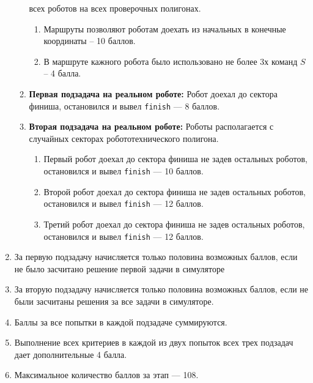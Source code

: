 \begin{enumerate}
\begin{enumerate}
                всех роботов на всех проверочных полигонах.
            \begin{enumerate}
                \item Маршруты позволяют роботам доехать из начальных в конечные координаты -- 10 баллов.
                \item В маршруте кажного робота было использовано не более 3х команд $S$  -- 4 балла.
            \end{enumerate}
        \item \textbf{Первая подзадача на реальном роботе:} Робот доехал до сектора финиша,
                остановился и вывел \texttt{finish} --- 8 баллов.
        \item \textbf{Вторая подзадача на реальном роботе:} Роботы располагается с случайных секторах
        робототехнического полигона.
        \begin{enumerate}
            \item Первый робот доехал до сектора финиша не задев остальных роботов, остановился и вывел \texttt{finish} --- 10 баллов.
            \item Второй робот доехал до сектора финиша не задев остальных роботов, остановился и вывел \texttt{finish} --- 12 баллов.
            \item Третий робот доехал до сектора финиша не задев остальных роботов, остановился и вывел \texttt{finish} --- 12 баллов.
        \end{enumerate}
    \end{enumerate}
    \item За первую подзадачу начисляется только половина возможных баллов, если не было засчитано решение первой задачи в симуляторе
    \item За вторую подзадачу начисляется только половина возможных баллов, если не были засчитаны решения за все задачи в симуляторе.
    \item Баллы за все попытки в каждой подзадаче суммируются.
    \item Выполнение всех критериев в каждой из двух попыток всех трех подзадач дает дополнительные 4 балла.
    \item Максимальное количество баллов за этап --- 108.
\end{enumerate}